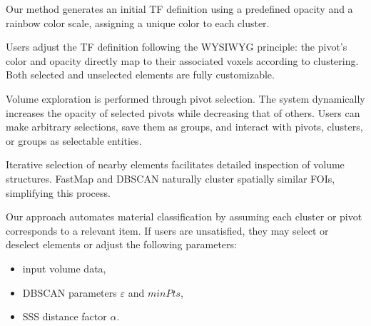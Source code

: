 Our method generates an initial TF definition using a predefined opacity and a rainbow color scale, assigning a unique color to each cluster.

Users adjust the TF definition following the WYSIWYG principle: the pivot’s color and opacity directly map to their associated voxels according to clustering. Both selected and unselected elements are fully customizable.

Volume exploration is performed through pivot selection. The system dynamically increases the opacity of selected pivots while decreasing that of others. Users can make arbitrary selections, save them as groups, and interact with pivots, clusters, or groups as selectable entities.

Iterative selection of nearby elements facilitates detailed inspection of volume structures. FastMap and DBSCAN naturally cluster spatially similar FOIs, simplifying this process.

Our approach automates material classification by assuming each cluster or pivot corresponds to a relevant item. If users are unsatisfied, they may select or deselect elements or adjust the following parameters:

\begin{itemize}
    \item input volume data,
    \item DBSCAN parameters $\varepsilon$ and $minPts$,
    \item SSS distance factor $\alpha$.
\end{itemize}
